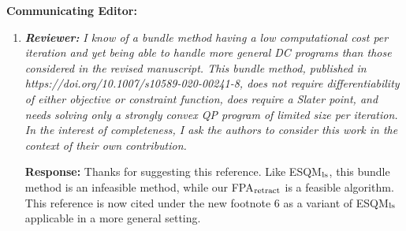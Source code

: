 \documentclass{article}
\begin{document}
\textbf{Communicating Editor:}
\begin{enumerate}
	\item  \textit{\textbf{Reviewer:}} \textit{ I know of a bundle method having a low computational cost per iteration and yet being able to handle more general DC programs than those considered in the revised manuscript. This bundle method, published in https://doi.org/10.1007/s10589-020-00241-8, does not require differentiability of either objective or constraint function, does require a Slater point, and needs solving only a strongly convex QP program of limited size per iteration.  In the interest of completeness, I ask the authors to consider this work in the context of their own contribution.}
	
	\textbf{Response:} Thanks for suggesting this reference. Like ESQM$_{\rm ls}$, this bundle method is an infeasible method, while our FPA$_{\rm retract}$ is a feasible algorithm. This reference is now cited under the new footnote 6 as a variant of ESQM$_{\rm ls}$ applicable in a more general setting.
	
\end{enumerate}
\end{document}
